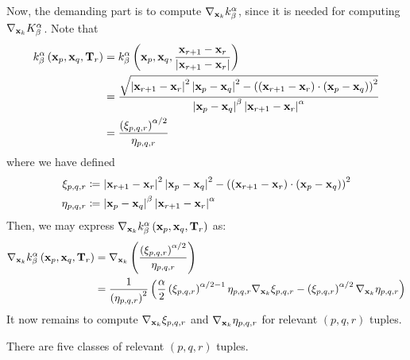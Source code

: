 \documentclass[../dissertation.tex]{subfiles}
\begin{document}
Now, the demanding part is to compute $\nabla_{\mathbf{x}_k} k_{\beta}^{\alpha}$, since it is needed for computing $\nabla_{\mathbf{x}_k} K_{\beta}^{\alpha}$.
Note that
\begin{align}
    k_{\beta}^{\alpha} \left( \mathbf{x}_p, \mathbf{x}_q, \mathbf{T}_r \right) &= k_{\beta}^{\alpha} \left( \mathbf{x}_p, \mathbf{x}_q, \frac{\mathbf{x}_{r+1} - \mathbf{x}_r}{\left| \mathbf{x}_{r+1} - \mathbf{x}_r \right|} \right) \nonumber \\
    &= \frac{\sqrt{\left| \mathbf{x}_{r+1} - \mathbf{x}_r \right|^2 \left| \mathbf{x}_p - \mathbf{x}_q \right|^2 - \left( \left( \mathbf{x}_{r+1} - \mathbf{x}_r \right) \cdot \left( \mathbf{x}_p - \mathbf{x}_q \right) \right)^2}}{\left| \mathbf{x}_p - \mathbf{x}_q \right|^{\beta} \left| \mathbf{x}_{r+1} - \mathbf{x}_r \right|^{\alpha}} \nonumber \\
    &= \frac{\left( \xi_{p,q,r} \right)^{\alpha/2}}{\eta_{p,q,r}}
    \label{equ: Exact Gradient 3}
\end{align}
where we have defined
\begin{align*}
    \xi_{p,q,r} &\coloneqq \left| \mathbf{x}_{r+1} - \mathbf{x}_r \right|^2 \left| \mathbf{x}_p - \mathbf{x}_q \right|^2 - \left( \left( \mathbf{x}_{r+1} - \mathbf{x}_r \right) \cdot \left( \mathbf{x}_p - \mathbf{x}_q \right) \right)^2 \\
    \eta_{p,q,r} &\coloneqq \left| \mathbf{x}_p - \mathbf{x}_q \right|^{\beta} \left| \mathbf{x}_{r+1} - \mathbf{x}_r \right|^{\alpha}
\end{align*}
Then, we may express $\nabla_{\mathbf{x}_k} k_{\beta}^{\alpha} \left( \mathbf{x}_p, \mathbf{x}_q, \mathbf{T}_r \right)$ as:
\begin{align}
    \nabla_{\mathbf{x}_k} k_{\beta}^{\alpha} \left( \mathbf{x}_p, \mathbf{x}_q, \mathbf{T}_r \right)
    &= \nabla_{\mathbf{x}_k} \left(\frac{\left( \xi_{p,q,r} \right)^{\alpha/2}}{\eta_{p,q,r}} \right) \nonumber \\
    &=
    \frac{1}{\left( \eta_{p,q,r} \right)^2} \left( \frac{\alpha}{2} \left( \xi_{p,q,r} \right)^{\alpha/2-1} \eta_{p,q,r} \nabla_{\mathbf{x}_k} \xi_{p,q,r} - \left( \xi_{p,q,r} \right)^{\alpha/2} \nabla_{\mathbf{x}_k} \eta_{p,q,r} \right)
    \label{equ: Exact Gradient 4}
\end{align}
It now remains to compute $\nabla_{\mathbf{x}_k} \xi_{p,q,r}$ and $\nabla_{\mathbf{x}_k} \eta_{p,q,r}$ for relevant $(p,q,r)$ tuples.

There are five classes of relevant $(p,q,r)$ tuples.
\end{document}
